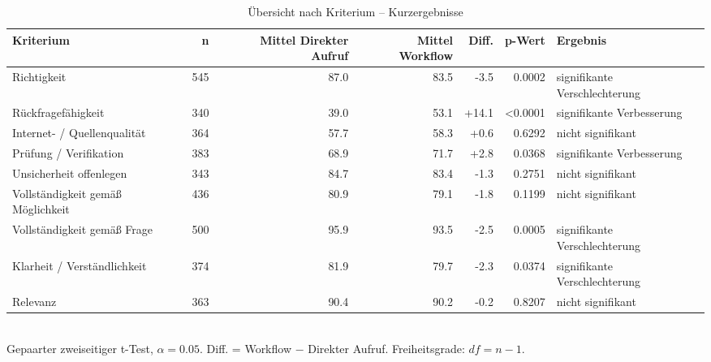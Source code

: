 \begin{table}[htbp]
\centering
\caption{Übersicht nach Kriterium -- Kurzergebnisse}
\begin{tabular}{lrrrrrl}
\toprule
Kriterium & n & Mittel Direkter Aufruf & Mittel Workflow & Diff. & p-Wert & Ergebnis \\
\midrule
Richtigkeit & 545 & 87.0 & 83.5 & -3.5 & 0.0002 & signifikante Verschlechterung \\
Rückfragefähigkeit & 340 & 39.0 & 53.1 & +14.1 & <0.0001 & signifikante Verbesserung \\
Internet- / Quellenqualität & 364 & 57.7 & 58.3 & +0.6 & 0.6292 & nicht signifikant \\
Prüfung / Verifikation & 383 & 68.9 & 71.7 & +2.8 & 0.0368 & signifikante Verbesserung \\
Unsicherheit offenlegen & 343 & 84.7 & 83.4 & -1.3 & 0.2751 & nicht signifikant \\
Vollständigkeit gemäß Möglichkeit & 436 & 80.9 & 79.1 & -1.8 & 0.1199 & nicht signifikant \\
Vollständigkeit gemäß Frage & 500 & 95.9 & 93.5 & -2.5 & 0.0005 & signifikante Verschlechterung \\
Klarheit / Verständlichkeit & 374 & 81.9 & 79.7 & -2.3 & 0.0374 & signifikante Verschlechterung \\
Relevanz & 363 & 90.4 & 90.2 & -0.2 & 0.8207 & nicht signifikant \\
\bottomrule
\end{tabular}
\\[2mm]
\footnotesize Gepaarter zweiseitiger t-Test, $\alpha=0.05$. Diff. = Workflow $-$ Direkter Aufruf. Freiheitsgrade: $df=n-1$.
\end{table}
